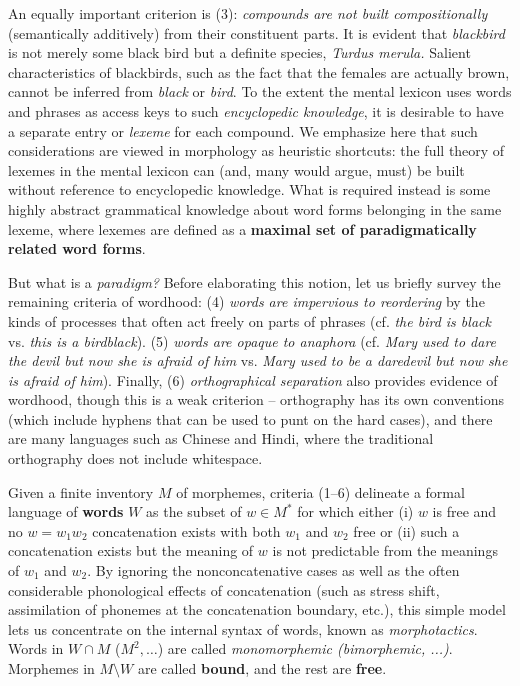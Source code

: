 An equally important criterion is (3): {\it compounds are not built
compositionally} (semantically additively) from their constituent
parts.
It is evident that {\it blackbird} is not merely some
black bird but a definite species, {\it Turdus merula.} Salient
characteristics of blackbirds, such as the fact that the females are actually
brown, cannot be inferred from {\it black} or {\it bird}. To the extent the
mental lexicon uses words and phrases as access keys to such {\it encyclopedic
knowledge}, it is desirable to have a separate entry or {\it lexeme} for each
compound. We emphasize here that such considerations are viewed in morphology
as heuristic shortcuts: the full theory of lexemes in the mental lexicon can
(and, many would argue, must) be built without reference to encyclopedic
knowledge.  What is required instead is some highly abstract grammatical
knowledge about word forms belonging in the same lexeme, where lexemes are
defined as a {\bf maximal set of paradigmatically related word forms}.

But what is a {\it paradigm?} Before elaborating this notion, let us briefly
survey the remaining criteria of wordhood: (4) {\it words are impervious to
reordering} by the kinds of processes that often act freely on parts of
phrases (cf.  {\it the bird is black} vs.  {\it *this is a birdblack}). (5)
{\it words are opaque to anaphora} (cf. {\it Mary used to dare the devil but
now she is afraid of him} vs. {\it *Mary used to be a daredevil but now she is
afraid of him}).  Finally, (6) {\it orthographical separation} also provides
evidence of wordhood, though this is a weak criterion -- orthography has its
own conventions (which include hyphens that can be used to punt on the hard
cases), and there are many languages such as Chinese and Hindi, where the
traditional orthography does not include whitespace. 

Given a finite inventory $M$ of morphemes, criteria (1--6) delineate a formal
language of {\bf words}  $W$ as the subset of $w \in M^*$
for which either (i) $w$ is free and no $w=w_1 w_2$ concatenation exists with
both $w_1$ and $w_2$ free or (ii) such a concatenation exists but the meaning
of $w$ is not predictable from the meanings of $w_1$ and $w_2$. By ignoring
the nonconcatenative cases as well as the often considerable phonological
effects of concatenation (such as stress shift, assimilation of phonemes at
the concatenation boundary, etc.), this simple model lets us concentrate on
the internal syntax of words, known as {\it
  morphotactics}. Words in $W \cap M$ ($M^2, \ldots$) are
called {\it monomorphemic (bimorphemic, ...)}.  Morphemes in $M \setminus W$
are called {\bf bound}, and the rest are {\bf free}.

